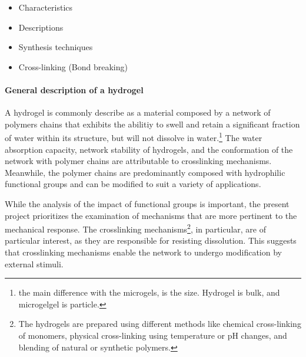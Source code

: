 \begin{itemize}
    \item Characteristics
    \item Descriptions 
    \item Synthesis techniques
    \item Cross-linking (Bond breaking)
\end{itemize}

\paragraph{General description of a hydrogel}
A hydrogel is commonly describe as a material composed by a network of polymers chains that exhibits the abilitiy to swell and retain a significant fraction of water within its structure, but will not dissolve in water\citep{ahmedHydrogelPreparationCharacterization2015a,ahmedHydrogelsMicrogelsDriving2025,priyaComprehensiveReviewHydrogel2024,bustamantetorresHydrogelsClassificationAccording2021}.\footnote{the main difference with the microgels, is the size. Hydrogel is bulk, and microgelgel is particle.}
The water absorption capacity, network stability of hydrogels, and the conformation of the network with polymer chains are attributable to crosslinking mechanisms\citep{priyaComprehensiveReviewHydrogel2024,ahmedHydrogelPreparationCharacterization2015a}.
Meanwhile, the polymer chains are predominantly composed with hydrophilic functional groups and can be modified to suit a variety of applications\citep{ahmedHydrogelPreparationCharacterization2015a,priyaComprehensiveReviewHydrogel2024,bustamantetorresHydrogelsClassificationAccording2021}.


While the analysis of the impact of functional groups is important, the present project prioritizes the examination of mechanisms that are more pertinent to the mechanical response. 
The crosslinking mechanisms\footnote{The hydrogels are prepared using different methods like chemical cross-linking of monomers, physical cross-linking using temperature or pH changes, and blending of natural or synthetic polymers.}, in particular, are of particular interest, as they are responsible for resisting dissolution. 
This suggests that crosslinking mechanisms enable the network to undergo modification by external stimuli.

